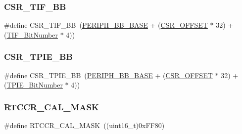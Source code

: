 \mbox{\label{group___b_k_p___private___defines_ga8d9e7cac2321fae6d257e8c1316264e3}} 
\subsubsection{\texorpdfstring{CSR\_TIF\_BB}{CSR\_TIF\_BB}}
{\footnotesize\ttfamily \#define C\+S\+R\+\_\+\+T\+I\+F\+\_\+\+BB~(\mbox{\hyperlink{group___peripheral__memory__map_gaed7efc100877000845c236ccdc9e144a}{P\+E\+R\+I\+P\+H\+\_\+\+B\+B\+\_\+\+B\+A\+SE}} + (\mbox{\hyperlink{group___r_c_c___private___defines_ga984cbe73312b6d3d355c5053763d499a}{C\+S\+R\+\_\+\+O\+F\+F\+S\+ET}} $\ast$ 32) + (\mbox{\hyperlink{group___b_k_p___private___defines_gac8b1b82c7029c05e720c50585762bcf2}{T\+I\+F\+\_\+\+Bit\+Number}} $\ast$ 4))}

\mbox{\label{group___b_k_p___private___defines_ga1f6dcf729994613b21f554ca371d393c}} 
\subsubsection{\texorpdfstring{CSR\_TPIE\_BB}{CSR\_TPIE\_BB}}
{\footnotesize\ttfamily \#define C\+S\+R\+\_\+\+T\+P\+I\+E\+\_\+\+BB~(\mbox{\hyperlink{group___peripheral__memory__map_gaed7efc100877000845c236ccdc9e144a}{P\+E\+R\+I\+P\+H\+\_\+\+B\+B\+\_\+\+B\+A\+SE}} + (\mbox{\hyperlink{group___r_c_c___private___defines_ga984cbe73312b6d3d355c5053763d499a}{C\+S\+R\+\_\+\+O\+F\+F\+S\+ET}} $\ast$ 32) + (\mbox{\hyperlink{group___b_k_p___private___defines_gac62e6ae9548498efa47fb72637545117}{T\+P\+I\+E\+\_\+\+Bit\+Number}} $\ast$ 4))}

\mbox{\label{group___b_k_p___private___defines_ga61a540c5dd9d18e936b8fd3e01f7f6ff}} 
\subsubsection{\texorpdfstring{RTCCR\_CAL\_MASK}{RTCCR\_CAL\_MASK}}
{\footnotesize\ttfamily \#define R\+T\+C\+C\+R\+\_\+\+C\+A\+L\+\_\+\+M\+A\+SK~((uint16\+\_\+t)0x\+F\+F80)}

